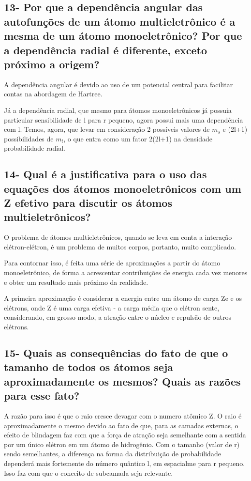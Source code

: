 \documentclass{article}
\begin{document}
\subsection{13- Por que a dependência angular das autofunções de um átomo multieletrônico é a mesma de um átomo monoeletrônico? Por que a dependência radial é diferente, exceto próximo a origem?}

A dependência angular é devido ao uso de um potencial central para facilitar contas na abordagem de Hartree.

Já a dependência radial, que mesmo para átomos monoeletrônicos já possuia particular sensibilidade de l para r pequeno, agora possui mais uma dependência com l. Temos, agora, que levar em consideração 2 possíveis valores de $m_s$ e (2l+1) possibilidades de $m_l$, o que entra como um fator 2(2l+1) na densidade probabilidade radial.

\subsection{14- Qual é a justificativa para o uso das equações dos átomos monoeletrônicos com um Z efetivo para discutir os átomos multieletrônicos?}
O problema de átomos multieletrônicos, quando se leva em conta a interação elétron-elétron, é um problema de muitos corpos, portanto, muito complicado.

Para contornar isso, é feita uma série de aproximações a partir do átomo monoeletrônico, de forma a acrescentar contribuições de energia cada vez menores e obter um resultado mais próximo da realidade. 

A primeira aproximação é considerar a energia entre um átomo de carga Ze e os elétrons, onde Z é uma carga efetiva - a carga média que o elétron sente, considerando, em grosso modo, a atração entre o núcleo e repulsão de outros elétrons.

\subsection{15- Quais as consequências do fato de que o tamanho de todos os átomos seja aproximadamente os mesmos? Quais as razões para esse fato?}

A razão para isso é que o raio cresce devagar com o numero atômico Z. O raio é aproximadamente o mesmo devido ao fato de que, para as camadas externas, o efeito de blindagem faz com que a força de atração seja semelhante com a sentida por um único elétron em um átomo de hidrogênio.
Com o tamanho (valor de r) sendo semelhantes, a diferença na forma da distribuição de probabilidade dependerá mais fortemente do número quântico l, em espacialme para r pequeno. Isso faz com que o conceito de subcamada seja relevante.
\end{document}
